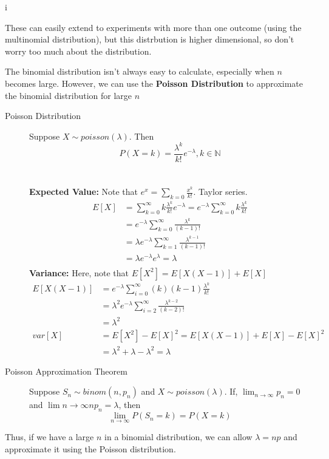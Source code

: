 i\documentclass[10pt]{article}
\begin{document}
\par
These can easily extend to experiments with more than one outcome (using the multinomial distribution), but this
distrbution is higher dimensional, so don't worry too much about the distribution.

The binomial distribution isn't always easy to calculate, especially when $n$ becomes large. However, we can use the \textbf{Poisson Distribution} to approximate the binomial distribution for large $n$

\begin{description}
    \item[Poisson Distribution] 
        Suppose $ X \sim poisson(\lambda) $. Then
        \[ P(X = k) = \frac{\lambda ^k}{k!} e^{-\lambda}, k \in \mathbb{N} \]
        \\\\
        \textbf{Expected Value:}
        Note that $e^x = \sum_{k=0} \frac{x^k}{k!}$. Taylor series.
        \begin{align*}
            E[X] &= \sum_{k=0}^{\infty}k\frac{\lambda ^k}{k!} e^{-\lambda} = e^{-\lambda}\sum_{k=0}^{\infty}k\frac{\lambda ^k}{k!} \\
            &= e^{-\lambda}\sum_{k=0}^{\infty}\frac{\lambda ^k}{(k-1)!} \\
            &= \lambda e^{-\lambda}\sum_{k=1}^{\infty}\frac{\lambda ^{k-1}}{(k-1)!} \\
            &= \lambda e^{-\lambda}e^{\lambda} = \lambda \\
        \end{align*}
        \textbf{Variance:}
        Here, note that $E[X^2] = E[X(X-1)] + E[X]$
        \begin{align*}
            E[X(X-1)] &= e^{-\lambda}\sum_{i=0}^{\infty}(k)(k-1) \frac{\lambda^k}{k!}\\
            &= \lambda ^2 e^{-\lambda}\sum_{i=2}^{\infty}\frac{\lambda^{k-2}}{(k-2)!} \\
            &= \lambda ^2 \\
            var[X] &= E[X^2] - E[X]^2 = E[X(X-1)] + E[X] - E[X]^2 \\
            &= \lambda ^2 + \lambda - \lambda ^2 = \lambda 
        \end{align*}

    \item[Poisson Approximation Theorem]
        Suppose $S_n \sim binom(n,p_n)$ and $X \sim poisson(\lambda)$. If,
        $\lim_{n\rightarrow \infty} p_n = 0$ and $\lim{n \rightarrow \infty} np_n = \lambda$, then
        \[\lim_{n \rightarrow \infty} P(S_n = k) = P(X = k) \]
\end{description}
\par
Thus, if we have a large $n$ in a binomial distribution, we can allow $\lambda = np$ and approximate it using
the Poisson distribution.
 
\end{document}
